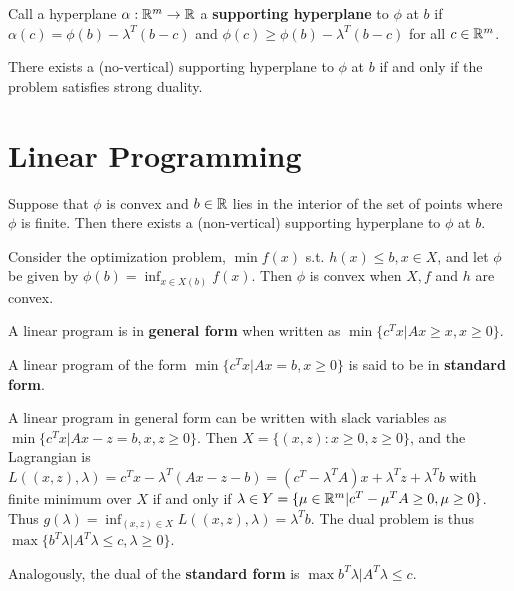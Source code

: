 \begin{defn}
  \label{sec:optimization-8}
  Call a hyperplane $\alpha: \mathbb{R}^{m} \rightarrow \mathbb{R}$ a
  \textbf{supporting hyperplane} to $\phi$ at $b$ if $\alpha(c) =
  \phi(b) - \lambda^{T}(b-c)$ and $\phi(c) \geq \phi(b) -
  \lambda^{T}(b-c)$ for all $c \in \mathbb{R}^{m}$.
\end{defn}

\begin{thm}
  \label{sec:optimization-10}
  There exists a (no-vertical) supporting hyperplane to $\phi$ at $b$
  if and only if the problem satisfies strong duality.
\end{thm}

\section{Linear Programming}
\label{sec:linear-programming}

\begin{thm}
  \label{sec:linear-programming-1}
  Suppose that $\phi$ is convex and $b \in \mathbb{R}$ lies in the interior of
  the set of points where $\phi$ is finite.  Then there exists a
  (non-vertical) supporting hyperplane to $\phi$ at $b$.
\end{thm}

\begin{thm}
  \label{sec:linear-programming-2}
  Consider the optimization problem, $\min f(x)$ s.t. $h(x) \leq b, x
  \in X$, and let $\phi$ be given by $\phi(b) = \inf_{x \in X(b)}
  f(x)$.  Then $\phi$ is convex when $X, f$ and $h$ are convex.
\end{thm}

\begin{defn}
  \label{sec:linear-programming-3}
  A linear program is in \textbf{general form} when written as $\min
  \{ c^{T} x | Ax \geq x, x \geq 0 \}$.

  A linear program of the form $\min \{ c^{T}x | Ax = b, x \geq 0 \} $
  is said to be in \textbf{standard form}.
\end{defn}

\begin{thm}
  \label{sec:linear-programming-4}
  A linear program in general form can be written with slack variables
  as $\min \{ c^{T} x | Ax - z = b, x, z \geq 0 \} $.  Then $X = \{
(x, z) : x \geq 0, z \geq 0 \} $, and the Lagrangian is $L((x, z),
\lambda) = c^{T} x - \lambda^{T}(Ax - z - b) = (c^{T} - \lambda^{T}
A)x + \lambda^{T} z + \lambda^{T}b$ with finite minimum over $X$ if
and only if $\lambda \in Y = \{ \mu \in \mathbb{R}^{m} | c^{T}- \mu^{T} A \geq
0, \mu \geq 0 \} $.  Thus $g(\lambda) = \inf_{(x, z) \in X} L((x, z),
\lambda) = \lambda^{T} b$.  The dual problem is thus $\max \{ b^{T}
\lambda | A^{T} \lambda \leq c, \lambda \geq 0 \}$.  

Analogously, the dual of the \textbf{standard form} is $\max b^{T}
\lambda | A^{T} \lambda \leq c$.
\end{thm}

